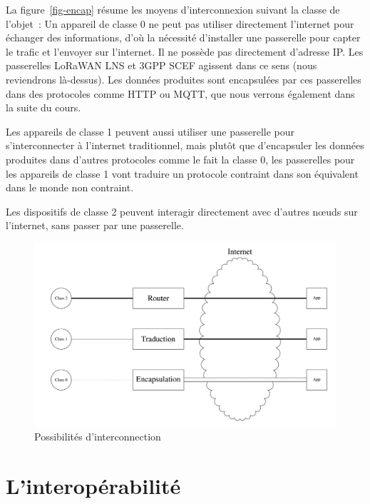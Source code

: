 La figure~\vref{fig-encap} résume les moyens d'interconnexion suivant la classe de l'objet~:
Un appareil de classe 0 ne peut pas utiliser directement l’internet pour échanger des informations, d’où la nécessité d’installer une passerelle pour capter le trafic et l’envoyer sur l’internet. Il ne possède pas directement d'adresse IP. Les passerelles LoRaWAN \ac{LNS} et \acs{3GPP} \ac{SCEF} agissent dans ce sens (nous reviendrons là-dessus). Les données produites sont encapsulées par ces passerelles dans des protocoles comme \ac{HTTP} ou \ac{MQTT}, que nous verrons également dans la suite du cours.

Les appareils de classe 1 peuvent aussi utiliser une passerelle pour s’interconnecter à l’internet traditionnel, mais plutôt que d'encapsuler les données produites dans d'autres protocoles comme le fait la classe 0, les passerelles pour les appareils de classe 1 vont traduire un protocole contraint dans son équivalent dans le monde non contraint.

Les dispositifs de classe 2 peuvent interagir directement avec d’autres nœuds sur l’internet, sans passer par une passerelle.

\begin{figure}[tbp]
\centerline{\includegraphics[width=1\columnwidth]{Pictures/Encpasul.png}}
\caption{Possibilités d'interconnection}
\label{fig-encap}
\end{figure}

  \vspace{2em}

\section{L'interopérabilité}

  \vspace{1em}

